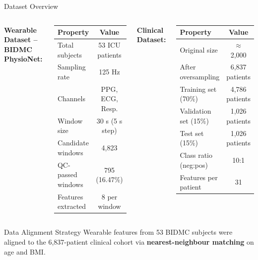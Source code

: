 \documentclass[aspectratio=169]{beamer}
\begin{document}
\begin{frame}{Dataset Overview}
  \begin{columns}[T]
      \textbf{Wearable Dataset -- BIDMC PhysioNet:}
      \begin{center}\small
      \begin{tabular}{@{}lc@{}}
        \toprule
        \textbf{Property} & \textbf{Value} \\
        \midrule
        Total subjects       & 53 ICU patients \\
        Sampling rate        & 125 Hz \\
        Channels             & PPG, ECG, Resp. \\
        Window size          & 30 s (5 s step) \\
        Candidate windows    & 4,823 \\
        QC-passed windows    & 795 (16.47\%) \\
        Features extracted   & 8 per window \\
        \bottomrule
      \end{tabular}
      \end{center}
      \textbf{Clinical Dataset:}
      \begin{center}\small
      \begin{tabular}{@{}lc@{}}
        \toprule
        \textbf{Property} & \textbf{Value} \\
        \midrule
        Original size        & $\approx$2,000 \\
        After oversampling   & 6,837 patients \\
        Training set (70\%)  & 4,786 patients \\
        Validation set (15\%) & 1,026 patients \\
        Test set (15\%)      & 1,026 patients \\
        Class ratio (neg:pos) & 10:1 \\
        Features per patient & 31 \\
        \bottomrule
      \end{tabular}
      \end{center}
  \end{columns}
  \vspace{0.3em}
  \begin{block}{Data Alignment Strategy}
    Wearable features from 53 BIDMC subjects were aligned to the 6,837-patient
    clinical cohort via \textbf{nearest-neighbour matching} on age and BMI.
  \end{block}
\end{frame}
\end{document}
